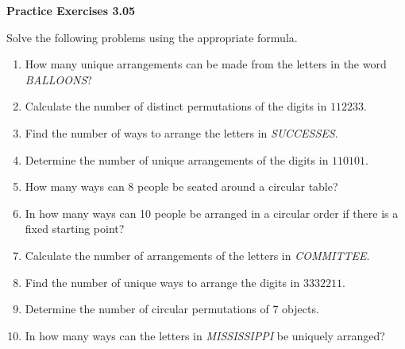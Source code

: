 \vspace{0.3ex}
\noindent\textbf{Practice Exercises 3.05}

\vspace{0.2ex}

Solve the following problems using the appropriate formula.

\begin{enumerate}[label=\color{blue}\arabic*.]
    \item How many unique arrangements can be made from the letters in the word \textit{BALLOONS}?
    \item Calculate the number of distinct permutations of the digits in \(112233\).
    \item Find the number of ways to arrange the letters in \textit{SUCCESSES}.
    \item Determine the number of unique arrangements of the digits in \(110101\).
    \item How many ways can 8 people be seated around a circular table?
    \item In how many ways can 10 people be arranged in a circular order if there is a fixed starting point?
    \item Calculate the number of arrangements of the letters in \textit{COMMITTEE}.
    \item Find the number of unique ways to arrange the digits in \(3332211\).
    \item Determine the number of circular permutations of 7 objects.
    \item In how many ways can the letters in \textit{MISSISSIPPI} be uniquely arranged?
\end{enumerate}
